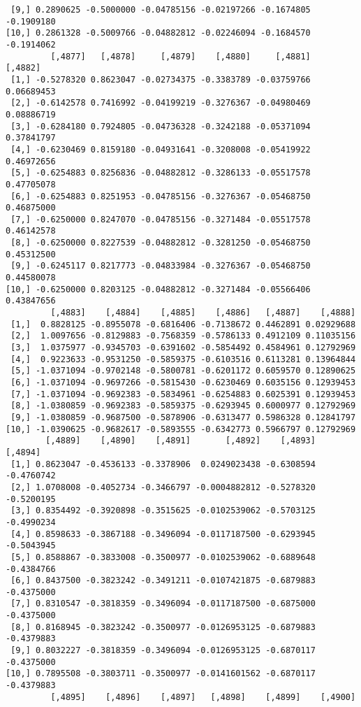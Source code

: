 \documentclass[
  letterpaper,
  DIV=11,
  numbers=noendperiod]{scrreprt}
\begin{document}
\begin{verbatim}
 [9,] 0.2890625 -0.5000000 -0.04785156 -0.02197266 -0.1674805 -0.1909180
[10,] 0.2861328 -0.5009766 -0.04882812 -0.02246094 -0.1684570 -0.1914062
         [,4877]   [,4878]     [,4879]    [,4880]     [,4881]    [,4882]
 [1,] -0.5278320 0.8623047 -0.02734375 -0.3383789 -0.03759766 0.06689453
 [2,] -0.6142578 0.7416992 -0.04199219 -0.3276367 -0.04980469 0.08886719
 [3,] -0.6284180 0.7924805 -0.04736328 -0.3242188 -0.05371094 0.37841797
 [4,] -0.6230469 0.8159180 -0.04931641 -0.3208008 -0.05419922 0.46972656
 [5,] -0.6254883 0.8256836 -0.04882812 -0.3286133 -0.05517578 0.47705078
 [6,] -0.6254883 0.8251953 -0.04785156 -0.3276367 -0.05468750 0.46875000
 [7,] -0.6250000 0.8247070 -0.04785156 -0.3271484 -0.05517578 0.46142578
 [8,] -0.6250000 0.8227539 -0.04882812 -0.3281250 -0.05468750 0.45312500
 [9,] -0.6245117 0.8217773 -0.04833984 -0.3276367 -0.05468750 0.44580078
[10,] -0.6250000 0.8203125 -0.04882812 -0.3271484 -0.05566406 0.43847656
         [,4883]    [,4884]    [,4885]    [,4886]   [,4887]    [,4888]
 [1,]  0.8828125 -0.8955078 -0.6816406 -0.7138672 0.4462891 0.02929688
 [2,]  1.0097656 -0.8129883 -0.7568359 -0.5786133 0.4912109 0.11035156
 [3,]  1.0375977 -0.9345703 -0.6391602 -0.5854492 0.4584961 0.12792969
 [4,]  0.9223633 -0.9531250 -0.5859375 -0.6103516 0.6113281 0.13964844
 [5,] -1.0371094 -0.9702148 -0.5800781 -0.6201172 0.6059570 0.12890625
 [6,] -1.0371094 -0.9697266 -0.5815430 -0.6230469 0.6035156 0.12939453
 [7,] -1.0371094 -0.9692383 -0.5834961 -0.6254883 0.6025391 0.12939453
 [8,] -1.0380859 -0.9692383 -0.5859375 -0.6293945 0.6000977 0.12792969
 [9,] -1.0380859 -0.9687500 -0.5878906 -0.6313477 0.5986328 0.12841797
[10,] -1.0390625 -0.9682617 -0.5893555 -0.6342773 0.5966797 0.12792969
        [,4889]    [,4890]    [,4891]       [,4892]    [,4893]    [,4894]
 [1,] 0.8623047 -0.4536133 -0.3378906  0.0249023438 -0.6308594 -0.4760742
 [2,] 1.0708008 -0.4052734 -0.3466797 -0.0004882812 -0.5278320 -0.5200195
 [3,] 0.8354492 -0.3920898 -0.3515625 -0.0102539062 -0.5703125 -0.4990234
 [4,] 0.8598633 -0.3867188 -0.3496094 -0.0117187500 -0.6293945 -0.5043945
 [5,] 0.8588867 -0.3833008 -0.3500977 -0.0102539062 -0.6889648 -0.4384766
 [6,] 0.8437500 -0.3823242 -0.3491211 -0.0107421875 -0.6879883 -0.4375000
 [7,] 0.8310547 -0.3818359 -0.3496094 -0.0117187500 -0.6875000 -0.4375000
 [8,] 0.8168945 -0.3823242 -0.3500977 -0.0126953125 -0.6879883 -0.4379883
 [9,] 0.8032227 -0.3818359 -0.3496094 -0.0126953125 -0.6870117 -0.4375000
[10,] 0.7895508 -0.3803711 -0.3500977 -0.0141601562 -0.6870117 -0.4379883
         [,4895]    [,4896]    [,4897]   [,4898]    [,4899]    [,4900]

\end{verbatim}
\end{document}
